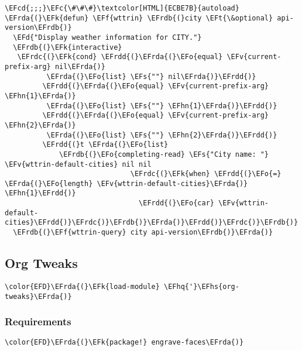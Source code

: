 \documentclass[a4wide,10pt]{article}
\newcommand{\EFc}[1]{\textcolor{EFc}{#1}} %
\newcommand{\EFcd}[1]{\textcolor{EFcd}{#1}} %
\newcommand{\EFs}[1]{\textcolor{EFs}{#1}} %
\newcommand{\EFd}[1]{\textcolor{EFd}{#1}} %
\newcommand{\EFk}[1]{\textcolor{EFk}{#1}} %
\newcommand{\EFf}[1]{\textcolor{EFf}{#1}} %
\newcommand{\EFv}[1]{\textcolor{EFv}{#1}} %
\newcommand{\EFt}[1]{\textcolor{EFt}{#1}} %
\newcommand{\EFo}[1]{\textcolor{EFo}{#1}} %
\newcommand{\EFhn}[1]{\textcolor{EFhn}{\textbf{#1}}} %
\newcommand{\EFhq}[1]{\textcolor{EFhq}{#1}} %
\newcommand{\EFhs}[1]{\textcolor{EFhs}{#1}} %
\newcommand{\EFrda}[1]{\textcolor{EFrda}{#1}} %
\newcommand{\EFrdb}[1]{\textcolor{EFrdb}{#1}} %
\newcommand{\EFrdc}[1]{\textcolor{EFrdc}{#1}} %
\newcommand{\EFrdd}[1]{\textcolor{EFrdd}{#1}} %
\begin{document}
\begin{Code}
\begin{Verbatim}
\EFcd{;;;}\EFc{\#\#\#}\textcolor[HTML]{ECBE7B}{autoload}
\EFrda{(}\EFk{defun} \EFf{wttrin} \EFrdb{(}city \EFt{\&optional} api-version\EFrdb{)}
  \EFd{"Display weather information for CITY."}
  \EFrdb{(}\EFk{interactive}
   \EFrdc{(}\EFk{cond} \EFrdd{(}\EFrda{(}\EFo{equal} \EFv{current-prefix-arg} nil\EFrda{)}
          \EFrda{(}\EFo{list} \EFs{""} nil\EFrda{)}\EFrdd{)}
         \EFrdd{(}\EFrda{(}\EFo{equal} \EFv{current-prefix-arg} \EFhn{1}\EFrda{)}
          \EFrda{(}\EFo{list} \EFs{""} \EFhn{1}\EFrda{)}\EFrdd{)}
         \EFrdd{(}\EFrda{(}\EFo{equal} \EFv{current-prefix-arg} \EFhn{2}\EFrda{)}
          \EFrda{(}\EFo{list} \EFs{""} \EFhn{2}\EFrda{)}\EFrdd{)}
         \EFrdd{(}t \EFrda{(}\EFo{list}
             \EFrdb{(}\EFo{completing-read} \EFs{"City name: "} \EFv{wttrin-default-cities} nil nil
                              \EFrdc{(}\EFk{when} \EFrdd{(}\EFo{=} \EFrda{(}\EFo{length} \EFv{wttrin-default-cities}\EFrda{)} \EFhn{1}\EFrdd{)}
                                \EFrdd{(}\EFo{car} \EFv{wttrin-default-cities}\EFrdd{)}\EFrdc{)}\EFrdb{)}\EFrda{)}\EFrdd{)}\EFrdc{)}\EFrdb{)}
  \EFrdb{(}\EFf{wttrin-query} city api-version\EFrdb{)}\EFrda{)}

\end{Verbatim}
\end{Code}

\subsection{Org Tweaks}
\label{sec:orga75e2b0}
\begin{Code}
\begin{Verbatim}
\color{EFD}\EFrda{(}\EFk{load-module} \EFhq{'}\EFhs{org-tweaks}\EFrda{)}
\end{Verbatim}
\end{Code}
\subsubsection{Requirements}
\label{sec:orgb3e5aec}
\begin{Code}
\begin{Verbatim}
\color{EFD}\EFrda{(}\EFk{package!} engrave-faces\EFrda{)}
\end{Verbatim}
\end{Code}
\end{document}
